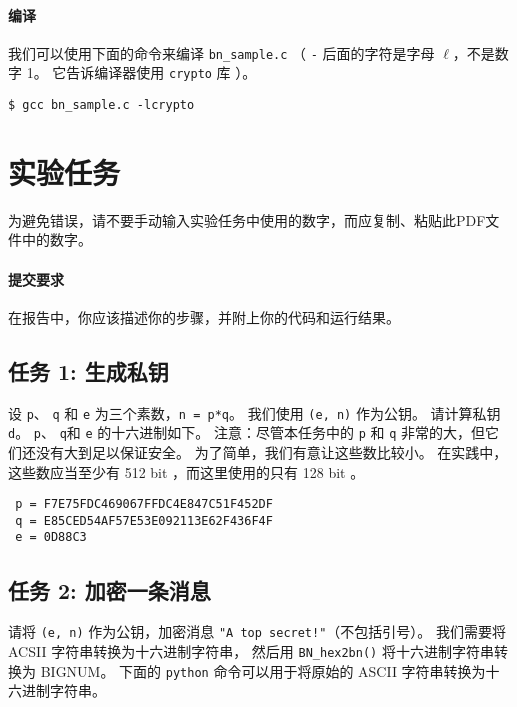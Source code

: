 \paragraph{编译}
我们可以使用下面的命令来编译 \texttt{bn\_sample.c}
（
\texttt{-} 后面的字符是字母 $\ell$，不是数字 1。
它告诉编译器使用 \texttt{crypto} 库
）。

\begin{lstlisting}
$ gcc bn_sample.c -lcrypto
\end{lstlisting}



\section{实验任务}


为避免错误，请不要手动输入实验任务中使用的数字，而应复制、粘贴此PDF文件中的数字。


\paragraph{提交要求}
在报告中，你应该描述你的步骤，并附上你的代码和运行结果。


\subsection{任务 1: 生成私钥}

设 \texttt{p}、 \texttt{q} 和 \texttt{e} 为三个素数，\texttt{n = p*q}。
我们使用 \texttt{(e, n)} 作为公钥。
请计算私钥 \texttt{d}。
\texttt{p}、 \texttt{q}和 \texttt{e} 的十六进制如下。
注意：尽管本任务中的 \texttt{p} 和 \texttt{q} 非常的大，但它们还没有大到足以保证安全。
为了简单，我们有意让这些数比较小。
在实践中，这些数应当至少有 512 bit ，而这里使用的只有 128 bit 。

\begin{lstlisting}
 p = F7E75FDC469067FFDC4E847C51F452DF
 q = E85CED54AF57E53E092113E62F436F4F
 e = 0D88C3
\end{lstlisting}


\subsection{任务 2: 加密一条消息}

请将 \texttt{(e, n)} 作为公钥，加密消息 \texttt{"A top secret!"}（不包括引号）。
我们需要将 ACSII 字符串转换为十六进制字符串，
然后用 \texttt{BN\_hex2bn()} 将十六进制字符串转换为 BIGNUM。
下面的 \texttt{python} 命令可以用于将原始的 ASCII 字符串转换为十六进制字符串。

